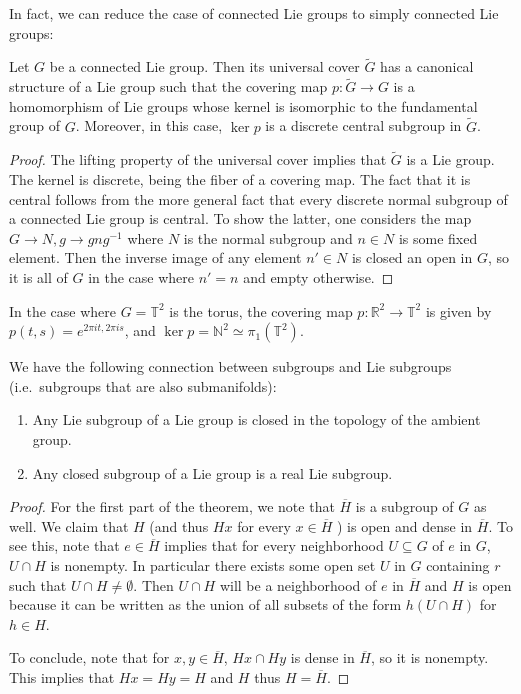 \documentclass{report}
\begin{document}
In fact, we can reduce the case of connected Lie groups to simply connected Lie groups:
\begin{theorem}
    Let $G$ be a connected Lie group. Then its universal cover $\tilde G$ has a canonical structure of a Lie group such that the covering map $p: \tilde G \to G$ is a homomorphism of Lie groups whose kernel is isomorphic to the fundamental group of $G$.
    Moreover, in this case, $\ker p$ is a discrete central subgroup in $\tilde G$.
\end{theorem}
\begin{proof}
    The lifting property of the universal cover implies that $\tilde G$ is a Lie group.
    The kernel is discrete, being the fiber of a covering map.
    The fact that it is central follows from the more general fact that every discrete normal subgroup of a connected Lie group is central.
    To show the latter, one considers the map $G \to N, g \to g n g^{-1}$ where $N$ is the normal subgroup and $n \in N$ is some fixed element.
    Then the inverse image of any element $n' \in N$ is closed an open in $G$, so it is all of $G$ in the case where $n' = n$ and empty otherwise.
\end{proof}

\begin{example}
    In the case where $G = \mathbb T^2$ is the torus, the covering map $p: \mathbb R^2 \to \mathbb T^2$ is given by $p(t,s) = e^{2\pi i t, 2\pi i s }$, and $\ker p = \mathbb N^2 \simeq \pi_1(\mathbb T^2)$.
\end{example}

We have the following connection between subgroups and Lie subgroups (i.e.\ subgroups that are also submanifolds):
\begin{theorem}\label{thm:closed_subgroup}
    \begin{enumerate}[label=(\roman*)]
        \item Any Lie subgroup of a Lie group is closed in the topology of the ambient group.
        \item Any closed subgroup of a Lie group is a real Lie subgroup.
    \end{enumerate}
\end{theorem}
\begin{proof}
    For the first part of the theorem, we note that $\overline H$ is a subgroup of $G$ as well.
    We claim that $H$ (and thus $Hx$ for every $x \in \overline H$ ) is open and dense in $\overline H$.
    To see this, note that $e \in \overline H$ implies that for every neighborhood $U \subseteq G$ of $e$ in $G$, $U \cap H$ is nonempty.
    In particular there exists some open set $U$ in $G$ containing $r$ such that $U \cap H \neq \emptyset$.
    Then $U\cap H$ will be a neighborhood of $e$ in $\overline H$ and $H$ is open because it can be written as the union of all subsets of the form $h(U\cap H)$ for $h \in H$.

    To conclude, note that for $x, y \in \overline H$, $Hx \cap Hy$ is dense in $\overline H$, so it is nonempty.
    This implies that $Hx = Hy = H$ and $H$ thus $H = \overline H$.
\end{proof}
\end{document}

